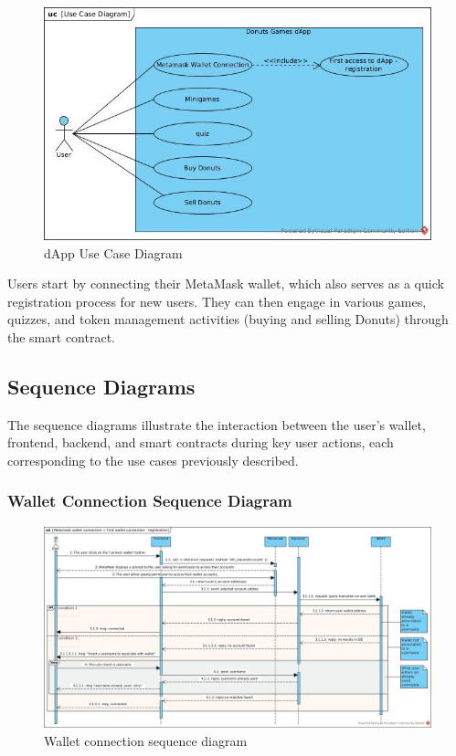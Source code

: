 \documentclass[../main.tex]{subfiles}
\begin{document}
\begin{figure}[H]
    \centering
    \includegraphics[width=\linewidth]{../src/diagrams/Use Case Diagram.jpg}
    \caption{dApp Use Case Diagram}
    \label{fig:useCaseDiag}
\end{figure}

Users start by connecting their MetaMask wallet, which also serves as a quick registration process for new users. They can then engage in various games, quizzes, and token management activities (buying and selling Donuts) through the smart contract.


\subsection{Sequence Diagrams}
The sequence diagrams illustrate the interaction between the user's wallet, frontend, backend, and smart contracts during key user actions, each corresponding to the use cases previously described.


\subsubsection{Wallet Connection Sequence Diagram}

\begin{figure}[H]
    \centering
    \includegraphics[width=\linewidth]{../src/diagrams/Metamask wallet connection + First wallet connection - registration.jpg}
    \caption{Wallet connection sequence diagram}
    \label{fig:walletConn_seqDiag}
\end{figure}
\end{document}
